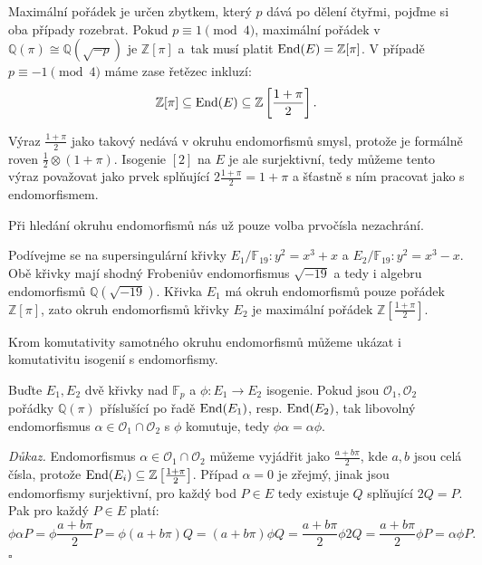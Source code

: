\documentclass[12pt]{report}
\begin{document}
Maximální pořádek je určen zbytkem, který $p$ dává po dělení čtyřmi, pojďme si oba případy rozebrat. Pokud $p \equiv 1 \pmod{4}$, maximální pořádek v $\mathbb{Q}(\pi) \cong \mathbb{Q}(\sqrt{-p})$ je $\mathbb{Z}[\pi]$ a~tak musí platit $\operatorname{End}(E) = \mathbb{Z}[\pi]$. V případě $p \equiv -1 \pmod{4}$ máme zase řetězec inkluzí:
\begin{equation*}
\mathbb{Z}[\pi] \subseteq \operatorname{End} (E) \subseteq \mathbb{Z} \left[ \frac{1+\pi}{2} \right].
\end{equation*}

\begin{poznamka}
Výraz $\frac{1+\pi}{2}$ jako takový nedává v okruhu endomorfismů smysl, protože je formálně roven $\frac{1}{2} \otimes (1+\pi)$. Isogenie $[2]$ na $E$ je ale surjektivní, tedy můžeme tento výraz považovat jako prvek splňující $2 \frac{1+\pi}{2} = 1+\pi$ a šťastně s ním pracovat jako s endomorfismem.
\end{poznamka}

Při hledání okruhu endomorfismů nás už pouze volba prvočísla nezachrání.
\begin{priklad}
Podívejme se na supersingulární křivky $E_1/\mathbb{F}_{19} : y^2 = x^3 + x$ a $E_2/\mathbb{F}_{19} : y^2 = x^3-x$. Obě křivky mají shodný Frobeniův endomorfismus $\sqrt{-19}$ a tedy i algebru endomorfismů $\mathbb{Q}(\sqrt{-19})$. Křivka $E_1$ má okruh endomorfismů pouze pořádek $\mathbb{Z}[\pi]$, zato okruh endomorfismů křivky $E_2$ je maximální pořádek $\mathbb{Z}\left[ \frac{1+\pi}{2} \right]$.
\end{priklad}

Krom komutativity samotného okruhu endomorfismů můžeme ukázat i komutativitu isogenií s endomorfismy.

\begin{lemma}\label{komut}
Buďte $E_1,E_2$ dvě křivky nad $\mathbb{F}_p$ a $\phi : E_1 \longrightarrow E_2$ isogenie. Pokud jsou $\mathcal{O}_1,\mathcal{O}_2$ pořádky $\mathbb{Q}(\pi)$ příslušící po řadě $\operatorname{End}(E_1)$, resp. $\operatorname{End}(E_2)$, tak libovolný endomorfismus $\alpha \in \mathcal{O}_1 \cap \mathcal{O}_2$ s $\phi$ komutuje, tedy $\phi \alpha = \alpha \phi$.
\end{lemma}
\noindent \textit{Důkaz.} Endomorfismus $\alpha \in \mathcal{O}_1 \cap \mathcal{O}_2$ můžeme vyjádřit jako $\frac{a+b \pi}{2}$, kde $a,b$ jsou celá čísla, protože $\operatorname{End}(E_i) \subseteq \mathbb{Z}\left[ \frac{1+\pi}{2} \right]$. Případ $\alpha = 0$ je zřejmý, jinak jsou endomorfismy surjektivní, pro každý bod $P \in E$ tedy existuje $Q$ splňující $2Q = P$. Pak pro každý $P \in E$ platí:
\begin{equation*}
\phi \alpha P = \phi \frac{a+b \pi}{2} P = \phi (a+b \pi) Q = (a+b \pi) \phi Q = \frac{a+b \pi}{2} \phi 2Q = \frac{a+ b \pi}{2} \phi P = \alpha \phi P.
\end{equation*}
\hfill $\square$\\
\end{document}
